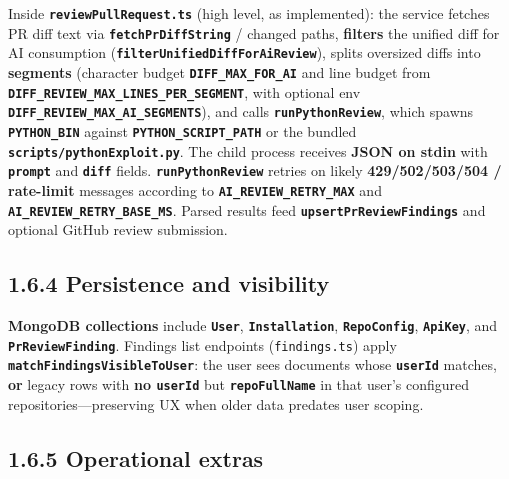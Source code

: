 \documentclass[11pt,a4paper]{report}
\begin{document}
Inside \textbf{\texttt{reviewPullRequest.ts}} (high level, as implemented): the service fetches PR diff text via \textbf{\texttt{fetchPrDiffString}} / changed paths, \textbf{filters} the unified diff for AI consumption (\textbf{\texttt{filterUnifiedDiffForAiReview}}), splits oversized diffs into \textbf{segments} (character budget \textbf{\texttt{DIFF\_MAX\_FOR\_AI}} and line budget from \textbf{\texttt{DIFF\_REVIEW\_MAX\_LINES\_PER\_SEGMENT}}, with optional env \textbf{\texttt{DIFF\_REVIEW\_MAX\_AI\_SEGMENTS}}), and calls \textbf{\texttt{runPythonReview}}, which spawns \textbf{\texttt{PYTHON\_BIN}} against \textbf{\texttt{PYTHON\_SCRIPT\_PATH}} or the bundled \textbf{\texttt{scripts/pythonExploit.py}}. The child process receives \textbf{JSON on stdin} with \textbf{\texttt{prompt}} and \textbf{\texttt{diff}} fields. \textbf{\texttt{runPythonReview}} retries on likely \textbf{429/502/503/504 / rate-limit} messages according to \textbf{\texttt{AI\_REVIEW\_RETRY\_MAX}} and \textbf{\texttt{AI\_REVIEW\_RETRY\_BASE\_MS}}. Parsed results feed \textbf{\texttt{upsertPrReviewFindings}} and optional GitHub review submission.


\subsection{1.6.4 Persistence and visibility}


\textbf{MongoDB collections} include \textbf{\texttt{User}}, \textbf{\texttt{Installation}}, \textbf{\texttt{RepoConfig}}, \textbf{\texttt{ApiKey}}, and \textbf{\texttt{PrReviewFinding}}. Findings list endpoints (\texttt{findings.ts}) apply \textbf{\texttt{matchFindingsVisibleToUser}}: the user sees documents whose \textbf{\texttt{userId}} matches, \textbf{or} legacy rows with \textbf{no \texttt{userId}} but \textbf{\texttt{repoFullName}} in that user’s configured repositories—preserving UX when older data predates user scoping.


\subsection{1.6.5 Operational extras}
\end{document}
